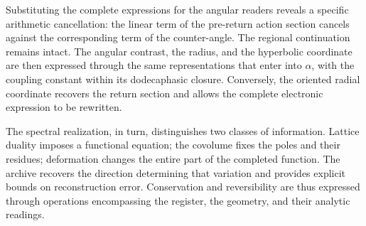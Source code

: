 Substituting the complete expressions for the angular readers reveals a specific arithmetic cancellation: the linear term of the pre-return action section cancels against the corresponding term of the counter-angle. The regional continuation remains intact. The angular contrast, the radius, and the hyperbolic coordinate are then expressed through the same representations that enter into \(\alpha\), with the coupling constant within its dodecaphasic closure. Conversely, the oriented radial coordinate recovers the return section and allows the complete electronic expression to be rewritten.

The spectral realization, in turn, distinguishes two classes of information. Lattice duality imposes a functional equation; the covolume fixes the poles and their residues; deformation changes the entire part of the completed function. The archive recovers the direction determining that variation and provides explicit bounds on reconstruction error. Conservation and reversibility are thus expressed through operations encompassing the register, the geometry, and their analytic readings.
